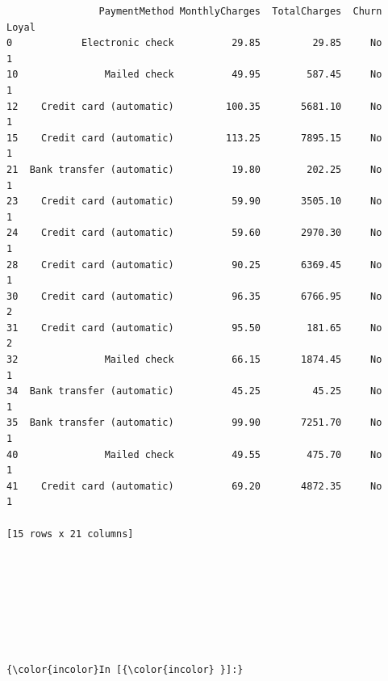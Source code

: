 \documentclass[8pt,onecolumn,aps,pra]{revtex4-1}
\begin{document}
\begin{verbatim}
                PaymentMethod MonthlyCharges  TotalCharges  Churn Loyal  
0            Electronic check          29.85         29.85     No     1  
10               Mailed check          49.95        587.45     No     1  
12    Credit card (automatic)         100.35       5681.10     No     1  
15    Credit card (automatic)         113.25       7895.15     No     1  
21  Bank transfer (automatic)          19.80        202.25     No     1  
23    Credit card (automatic)          59.90       3505.10     No     1  
24    Credit card (automatic)          59.60       2970.30     No     1  
28    Credit card (automatic)          90.25       6369.45     No     1  
30    Credit card (automatic)          96.35       6766.95     No     2  
31    Credit card (automatic)          95.50        181.65     No     2  
32               Mailed check          66.15       1874.45     No     1  
34  Bank transfer (automatic)          45.25         45.25     No     1  
35  Bank transfer (automatic)          99.90       7251.70     No     1  
40               Mailed check          49.55        475.70     No     1  
41    Credit card (automatic)          69.20       4872.35     No     1  

[15 rows x 21 columns]
    \end{verbatim}

    
    \begin{center}
    \end{center}
    { \hspace*{\fill} \\}
    
    \begin{center}
    \end{center}
    { \hspace*{\fill} \\}
    
    \begin{center}
    \end{center}
    { \hspace*{\fill} \\}
    
    \begin{center}
    \end{center}
    { \hspace*{\fill} \\}
    \begin{Verbatim}[commandchars=\\\{\}]
{\color{incolor}In [{\color{incolor} }]:} 
\end{Verbatim}
\end{document}
